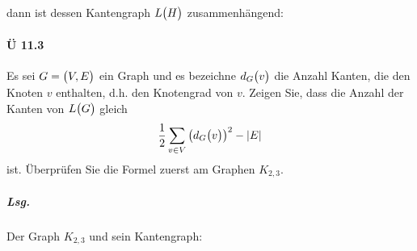\documentclass{scrreprt}
\begin{document}
\begin{enumerate}[(a)]

  dann ist dessen Kantengraph $L\qty\big(H)$ zusammenhängend:

\end{enumerate}

\paragraph{Ü 11.3} Es sei $G = \qty\big(V, E)$ ein Graph und es bezeichne
$d_G\qty\big(v)$ die Anzahl Kanten, die den Knoten $v$ enthalten, d.h. den
Knotengrad von $v$.
Zeigen Sie, dass die Anzahl der Kanten von $L\qty\big(G)$ gleich
\[
  \frac{1}{2}\sum_{v \in V}\qty(d_G\qty\big(v))^2 - \abs{E}
\]
ist.
Überprüfen Sie die Formel zuerst am Graphen $K_{2, 3}$.

\subparagraph{Lsg.} Der Graph $K_{2, 3}$ und sein Kantengraph:
\end{document}
